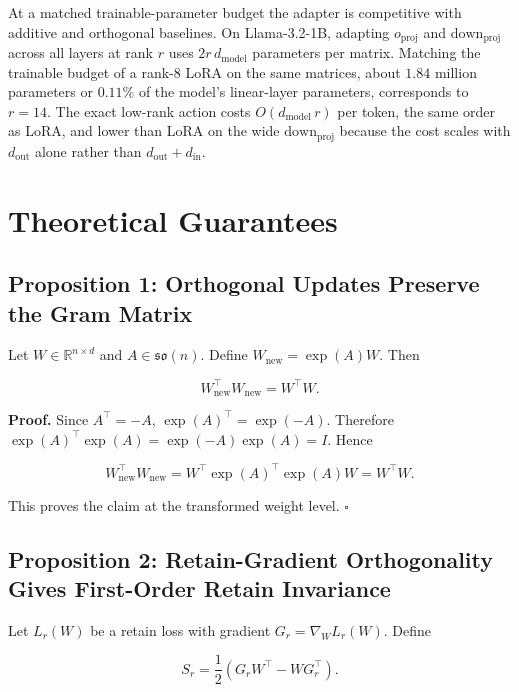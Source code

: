\documentclass[
]{article}
\begin{document}
At a matched trainable-parameter budget the adapter is competitive with additive and orthogonal baselines. On Llama-3.2-1B, adapting \(o_{\mathrm{proj}}\) and \(\mathrm{down}_{\mathrm{proj}}\) across all layers at rank \(r\) uses \(2r\,d_{\mathrm{model}}\) parameters per matrix. Matching the trainable budget of a rank-8 LoRA on the same matrices, about \(1.84\) million parameters or \(0.11\%\) of the model's linear-layer parameters, corresponds to \(r=14\). The exact low-rank action costs \(O(d_{\mathrm{model}}\,r)\) per token, the same order as LoRA, and lower than LoRA on the wide \(\mathrm{down}_{\mathrm{proj}}\) because the cost scales with \(d_{\mathrm{out}}\) alone rather than \(d_{\mathrm{out}}+d_{\mathrm{in}}\).

\section{Theoretical Guarantees}\label{theoretical-guarantees}

\subsection{Proposition 1: Orthogonal Updates Preserve the Gram Matrix}\label{proposition-1-orthogonal-updates-preserve-the-gram-matrix}

Let \(W\in\mathbb{R}^{n\times d}\) and \(A\in\mathfrak{so}(n)\). Define \(W_{\mathrm{new}}=\exp(A)W\). Then

\[
W_{\mathrm{new}}^\top W_{\mathrm{new}}=W^\top W.
\]

\textbf{Proof.} Since \(A^\top=-A\), \(\exp(A)^\top=\exp(-A)\). Therefore \(\exp(A)^\top\exp(A)=\exp(-A)\exp(A)=I\). Hence

\[
W_{\mathrm{new}}^\top W_{\mathrm{new}}
=W^\top\exp(A)^\top\exp(A)W
=W^\top W.
\]

This proves the claim at the transformed weight level. \(\square\)

\subsection{Proposition 2: Retain-Gradient Orthogonality Gives First-Order Retain Invariance}\label{proposition-2-retain-gradient-orthogonality-gives-first-order-retain-invariance}

Let \(L_r(W)\) be a retain loss with gradient \(G_r=\nabla_W L_r(W)\). Define

\[
S_r=\frac{1}{2}(G_rW^\top-WG_r^\top).
\]
\end{document}

